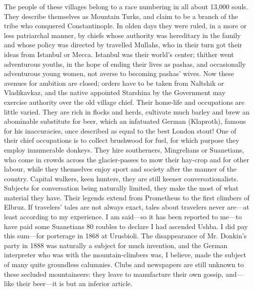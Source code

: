 \documentclass{article}
\begin{document}
	The people of these villages belong to a race numbering in all about 13,000 souls. They describe themselves as Mountain Turks, and claim to be a branch of the tribe who conquered Constantinople. In olden days they were ruled, in a more or less patriarchal manner, by chiefs whose authority was hereditary in the family and whose policy was directed by travelled Mullahs, who in their turn got their ideas from Istanbul or Mecca. Istanbul was their world's center; thither went adventurous youths, in the hope of ending their lives as pashas, and occasionally adventurous young women, not averse to becoming pashas' wives. Now these avenues for ambition are closed; orders have to be taken from Naltshik or Vladikavkaz, and the native appointed Starshina by the Government may exercise authority over the old village chief. Their home-life and occupations are little varied. They are rich in flocks and herds, cultivate much barley and brew an abominable substitute for beer, which an infatuated German (Klaproth), famous for his inaccuracies, once described as equal to the best London stout! One of their chief occupations is to collect brushwood for fuel, for which purpose they employ innumerable donkeys. They hire southerners, Mingrelians or Suanetians, who come in crowds across the glacier-passes to mow their hay-crop and for other labour, while they themselves enjoy sport and society after the manner of the country. Capital walkers, keen hunters, they are still keener conversationalists. Subjects for conversation being naturally limited, they make the most of what material they have. Their legends extend from Prometheus to the first climbers of Elbruz. If travelers’ tales are not always exact, tales about travelers never are—at least according to my experience. I am said—so it has been reported to me—to have paid some Suanetians 80 roubles to declare I had ascended Ushba. I did pay this sum—for porterage in 1868 at Urusbioli. The disappearance of Mr. Donkin's party in 1888 was naturally a subject for much invention, and the German interpreter who was with the mountain-climbers was, I believe, made the subject of many quite groundless calumnies. Clubs and newspapers are still unknown to these secluded mountaineers: they leave to manufacture their own gossip, and—like their beer—it is but an inferior article. 
	
	
	
\end{document}

